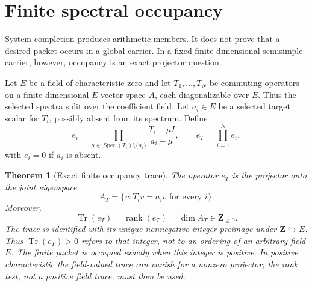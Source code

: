 \documentclass[11pt]{article}
\newtheorem{theorem}{Theorem}[section]
\theoremstyle{definition}
\theoremstyle{remark}
\newcommand{\Z}{\mathbf Z}
\newcommand{\Spec}{\operatorname{Spec}}
\newcommand{\Tr}{\operatorname{Tr}}
\newcommand{\rank}{\operatorname{rank}}
\begin{document}
\section{Finite spectral occupancy}

System completion produces arithmetic members.  It does not prove that a desired packet occurs in a global carrier.  In a fixed finite-dimensional semisimple carrier, however, occupancy is an exact projector question.

Let \(E\) be a field of characteristic zero and let \(T_1,\ldots,T_N\) be commuting operators on a finite-dimensional \(E\)-vector space \(A\), each diagonalizable over \(E\).  Thus the selected spectra split over the coefficient field.  Let \(a_i\in E\) be a selected target scalar for \(T_i\), possibly absent from its spectrum.  Define
\[
e_i
=
\prod_{\mu\in\Spec(T_i)\setminus\{a_i\}}
\frac{T_i-\mu I}{a_i-\mu},
\qquad
e_T=\prod_{i=1}^{N}e_i,
\]
with \(e_i=0\) if \(a_i\) is absent.

\begin{theorem}[Exact finite occupancy trace]
The operator \(e_T\) is the projector onto the joint eigenspace
\[
A_T
=
\{v:T_iv=a_iv\text{ for every }i\}.
\]
Moreover,
\[
\boxed{
\Tr(e_T)=\rank(e_T)=\dim A_T\in\Z_{\ge0}.
}
\]
The trace is identified with its unique nonnegative integer preimage under \(\Z\hookrightarrow E\).  Thus \(\Tr(e_T)>0\) refers to that integer, not to an ordering of an arbitrary field \(E\).  The finite packet is occupied exactly when this integer is positive.  In positive characteristic the field-valued trace can vanish for a nonzero projector; the rank test, not a positive field trace, must then be used.
\end{theorem}
\end{document}
